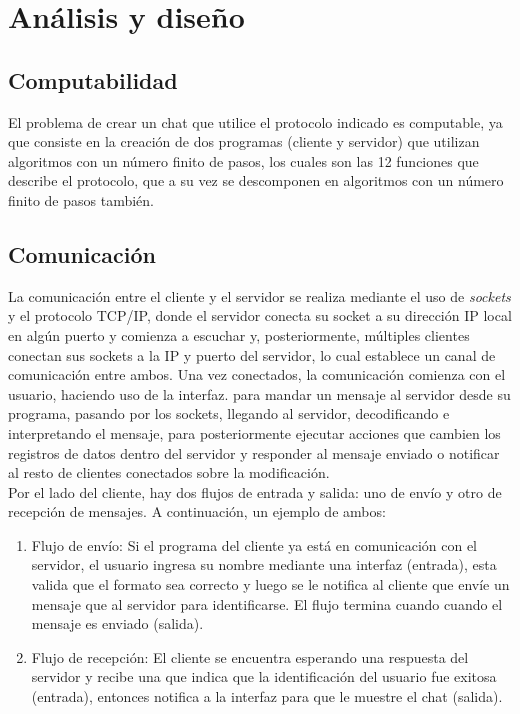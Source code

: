 \chapter{Análisis y diseño}

\section{Computabilidad}

El problema de crear un chat que utilice el protocolo indicado es computable, ya que consiste en la creación de dos programas (cliente y servidor) que utilizan algoritmos con un número finito de pasos, los cuales son las 12 funciones que describe el protocolo, que a su vez se descomponen en algoritmos con un número finito de pasos también.

\section{Comunicación}
La comunicación entre el cliente y el servidor se realiza mediante el uso de \textit{sockets} y el protocolo TCP/IP, donde el servidor conecta su socket a su dirección IP local en algún puerto y comienza a escuchar y, posteriormente, múltiples clientes conectan sus sockets a la IP y puerto del servidor, lo cual establece un canal de comunicación entre ambos. Una vez conectados, la comunicación comienza con el usuario, haciendo uso de la interfaz. para mandar un mensaje al servidor desde su programa, pasando por los sockets, llegando al servidor, decodificando e interpretando el mensaje, para posteriormente ejecutar acciones que cambien los registros de datos dentro del servidor y responder al mensaje enviado o notificar al resto de clientes conectados sobre la modificación.
\\

Por el lado del cliente, hay dos flujos de entrada y salida: uno de envío y otro de recepción de mensajes. A continuación, un ejemplo de ambos:
\begin{enumerate}
	\item Flujo de envío: Si el programa del cliente ya está en comunicación con el servidor, el usuario ingresa su nombre mediante una interfaz (entrada), esta valida que el formato sea correcto y luego se le notifica al cliente que envíe un mensaje que al servidor para identificarse. El flujo termina cuando cuando el mensaje es enviado (salida).
	\item Flujo de recepción: El cliente se encuentra esperando una respuesta del servidor y recibe una que indica que la identificación del usuario fue exitosa (entrada), entonces notifica a la interfaz para que le muestre el chat (salida).
\end{enumerate}

